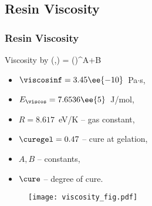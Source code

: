 \documentclass[compress]{beamer}%
\newenvironment{myalign}
{\align\color{\notcolor}}
{
  \nonumber
  \endalign
  \vspace{-1em}
}
\begin{document}
\subsection{Resin Viscosity}

\begin{frame}
  \frametitle{Resin Viscosity}
      Viscosity by \citet{Kenny1992}
      \begin{myalign}
        \viscos(\temp,\cure) =
        \viscosinf {} \left(\frac{\curegel}{\curegel - \cure}\right)^{A+B\cure} 
      \end{myalign}
      {\begin{multicols}{2}
      \begin{itemize}
        \item $\viscosinf=3.45\ee{-10}$~Pa$\cdot$s, %
        \item $E_\viscos = 7.6536\ee{5}$~J/mol, %
        \item $R = 8.617$~eV/K --  gas constant,
        \item $\curegel = 0.47$ -- cure at  gelation,
        \item $A, B$ -- constants,
      \item $\cure$ -- degree of cure.
      \end{itemize}
    \end{multicols}}

      \begin{figure}
  \centering
  \texttt{[image: viscosity\_fig.pdf]}
  \label{fig:viscos}
\end{figure}
  
\end{frame}
\end{document}
